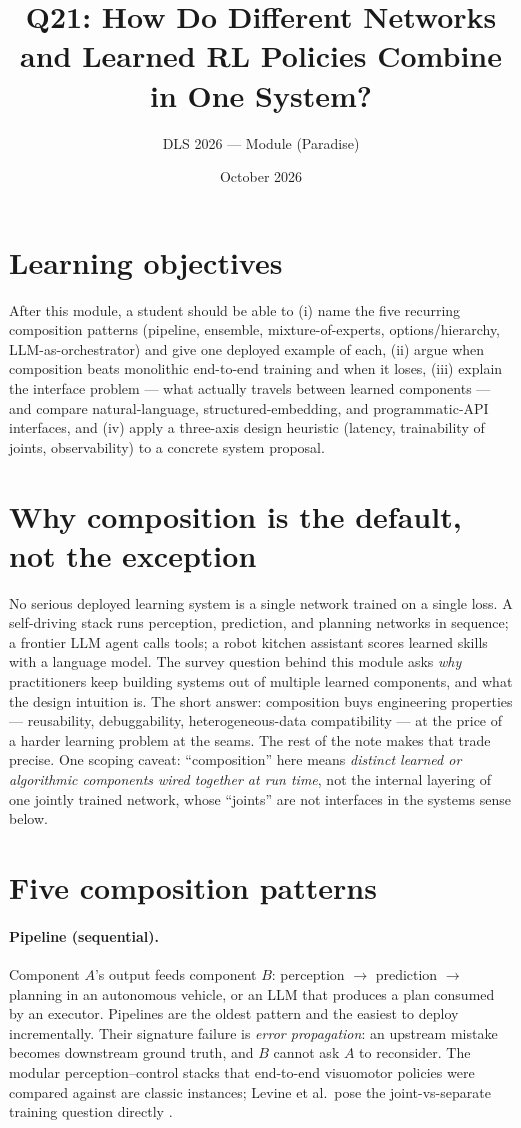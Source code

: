 \documentclass[11pt]{article}
\title{Q21: How Do Different Networks and Learned RL Policies Combine in One System?}
\author{DLS 2026 --- Module (Paradise)}
\date{October 2026}
\begin{document}
\maketitle

\section*{Learning objectives}
After this module, a student should be able to (i) name the five recurring composition patterns (pipeline, ensemble, mixture-of-experts, options/hierarchy, LLM-as-orchestrator) and give one deployed example of each, (ii) argue when composition beats monolithic end-to-end training and when it loses, (iii) explain the interface problem --- what actually travels between learned components --- and compare natural-language, structured-embedding, and programmatic-API interfaces, and (iv) apply a three-axis design heuristic (latency, trainability of joints, observability) to a concrete system proposal.

\section{Why composition is the default, not the exception}
No serious deployed learning system is a single network trained on a single loss. A self-driving stack runs perception, prediction, and planning networks in sequence; a frontier LLM agent calls tools; a robot kitchen assistant scores learned skills with a language model. The survey question behind this module asks \emph{why} practitioners keep building systems out of multiple learned components, and what the design intuition is. The short answer: composition buys engineering properties --- reusability, debuggability, heterogeneous-data compatibility --- at the price of a harder learning problem at the seams. The rest of the note makes that trade precise. One scoping caveat: ``composition'' here means \emph{distinct learned or algorithmic components wired together at run time}, not the internal layering of one jointly trained network, whose ``joints'' are not interfaces in the systems sense below.

\section{Five composition patterns}
\label{sec:patterns}

\paragraph{Pipeline (sequential).} Component $A$'s output feeds component $B$: perception $\to$ prediction $\to$ planning in an autonomous vehicle, or an LLM that produces a plan consumed by an executor. Pipelines are the oldest pattern and the easiest to deploy incrementally. Their signature failure is \emph{error propagation}: an upstream mistake becomes downstream ground truth, and $B$ cannot ask $A$ to reconsider. The modular perception--control stacks that end-to-end visuomotor policies were compared against are classic instances; Levine et al.\ pose the joint-vs-separate training question directly \cite{levine2016end}.
\end{document}
